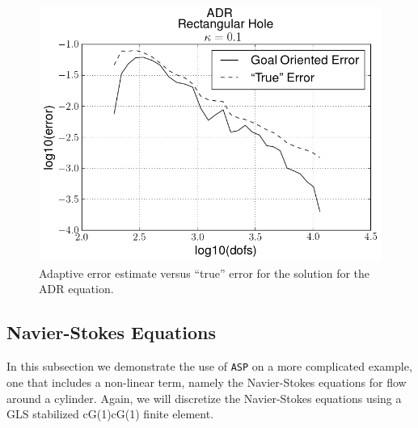     
    
    \begin{figure}[h!]
        \centering
        \includegraphics[scale=0.5]{Figures/AdaptiveADRkappa1E-1.png}
        \caption{Adaptive error estimate versus ``true'' error for the solution
            for the ADR equation.}
        \label{fig:ADR_err}
    \end{figure}

\subsection{Navier-Stokes Equations} \label{sse:NSE}

    In this subsection we demonstrate the use of \texttt{ASP} on a more complicated
    example, one that includes a non-linear term, namely the Navier-Stokes
    equations for flow around a cylinder.  Again, we will discretize the
    Navier-Stokes equations using a GLS stabilized cG(1)cG(1) finite element.

